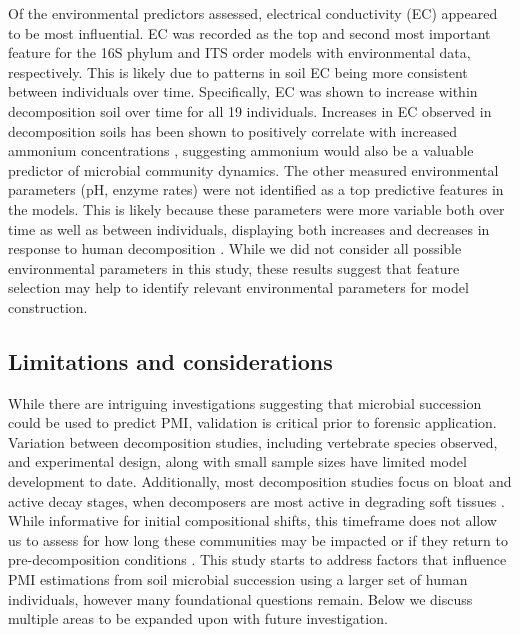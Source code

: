 \documentclass[
  10pt,
  letterpaper,
]{article}
\begin{document}
Of the environmental predictors assessed, electrical conductivity (EC)
appeared to be most influential. EC was recorded as the top and second
most important feature for the 16S phylum and ITS order models with
environmental data, respectively. This is likely due to patterns in soil
EC being more consistent between individuals over time. Specifically, EC
was shown to increase within decomposition soil over time for all 19
individuals. Increases in EC observed in decomposition soils has been
shown to positively correlate with increased ammonium concentrations
\citep{keenan_mortality_2018, keenan_spatial_2019}, suggesting ammonium
would also be a valuable predictor of microbial community dynamics. The
other measured environmental parameters (pH, enzyme rates) were not
identified as a top predictive features in the models. This is likely
because these parameters were more variable both over time as well as
between individuals, displaying both increases and decreases in response
to human decomposition \citep{mason_body_2022}. While we did not
consider all possible environmental parameters in this study, these
results suggest that feature selection may help to identify relevant
environmental parameters for model construction.

\hypertarget{limitations-and-considerations}{%
\subsection{Limitations and
considerations}\label{limitations-and-considerations}}

While there are intriguing investigations suggesting that microbial
succession could be used to predict PMI, validation is critical prior to
forensic application. Variation between decomposition studies, including
vertebrate species observed, and experimental design, along with small
sample sizes have limited model development to date. Additionally, most
decomposition studies focus on bloat and active decay stages, when
decomposers are most active in degrading soft tissues
\citep{payne_summer_1965, carter_cadaver_2007}. While informative for
initial compositional shifts, this timeframe does not allow us to assess
for how long these communities may be impacted or if they return to
pre-decomposition conditions \citep{shade_fundamentals_2012}. This study
starts to address factors that influence PMI estimations from soil
microbial succession using a larger set of human individuals, however
many foundational questions remain. Below we discuss multiple areas to
be expanded upon with future investigation.
\end{document}
